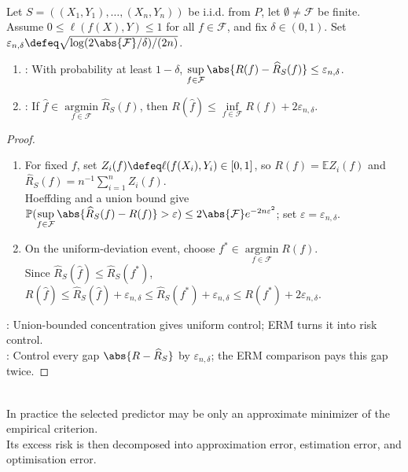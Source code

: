 \begin{theorem} \label{thm:sl-finite-class-erm-bound} \\
Let $S=((X_1,Y_1),\ldots,(X_n,Y_n))$ be i.i.d. from $P$, let $\emptyset\neq\mathcal{F}$ be finite.\\
Assume $0\leq\ell(f(X),Y)\leq1$ for all $f\in\mathcal{F}$, and fix $\delta\in(0,1)$. Set $\varepsilon_{n,\delta}\defeq\sqrt{\log(2\abs{\mathcal{F}}/\delta)/(2n)}$.
\begin{enumerate}[label=(\roman*)]
\setlength{\itemsep}{0pt}
\item {}: With probability at least $1-\delta$, $\sup\limits_{f\in\mathcal{F}}\abs{R(f)-\widehat{R}_S(f)}\leq\varepsilon_{n,\delta}$.
\item {}: If $\widehat{f}\in\operatorname*{argmin}\limits_{f\in\mathcal{F}}\widehat{R}_S(f)$, then $R(\widehat{f})\leq\inf\limits_{f\in\mathcal{F}}R(f)+2\varepsilon_{n,\delta}$.
\end{enumerate}
\begin{proof}
\begin{enumerate}[label=(\roman*)]
\setlength{\itemsep}{0pt}
\item For fixed $f$, set $Z_i(f)\defeq\ell(f(X_i),Y_i)\in[0,1]$, so $R(f)=\mathbb{E}Z_i(f)$ and $\widehat{R}_S(f)=n^{-1}\sum\limits_{i=1}^nZ_i(f)$.\\
Hoeffding and a union bound give $\mathbb{P}(\sup\limits_{f\in\mathcal{F}}\abs{\widehat{R}_S(f)-R(f)}>\varepsilon)\leq2\abs{\mathcal{F}}e^{-2n\varepsilon^2}$; set $\varepsilon=\varepsilon_{n,\delta}$.
\item On the uniform-deviation event, choose $f^*\in\operatorname*{argmin}\limits_{f\in\mathcal{F}}R(f)$.\\
Since $\widehat{R}_S(\widehat{f})\leq\widehat{R}_S(f^*)$, $R(\widehat{f})\leq\widehat{R}_S(\widehat{f})+\varepsilon_{n,\delta}\leq\widehat{R}_S(f^*)+\varepsilon_{n,\delta}\leq R(f^*)+2\varepsilon_{n,\delta}$.
\end{enumerate}
: Union-bounded concentration gives uniform control; ERM turns it into risk control.\\
: Control every gap $\abs{R-\widehat{R}_S}$ by $\varepsilon_{n,\delta}$; the ERM comparison pays this gap twice.
\end{proof}
\end{theorem}

\begin{remark} \label{rem:sl-erm-computational-statistical-split} \\
In practice the selected predictor may be only an approximate minimizer of the empirical criterion. \\
Its excess risk is then decomposed into approximation error, estimation error, and optimisation error.
\end{remark}
